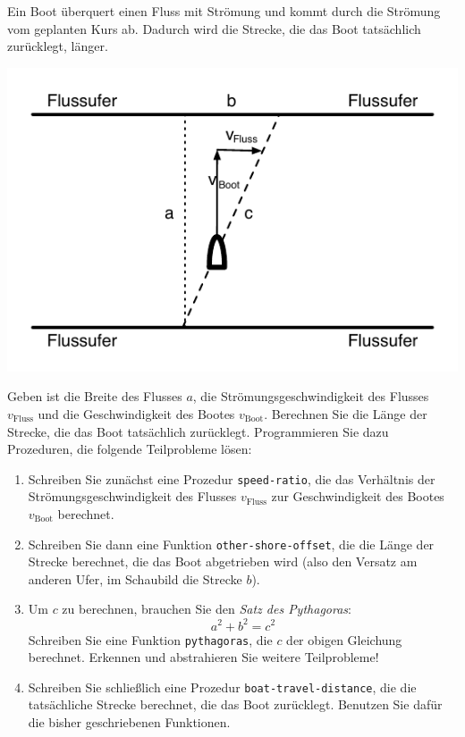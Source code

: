 \begin{aufgabe}

 Ein Boot überquert einen Fluss mit Strömung und
  kommt durch die Strömung vom geplanten Kurs ab.  Dadurch wird die
  Strecke, die das Boot tatsächlich zurücklegt, länger.

  \begin{center}
    \includegraphics{riverboat}
  \end{center}

  Geben ist die Breite des Flusses $a$, die Strömungsgeschwindigkeit
  des Flusses $v_{\text{Fluss}}$ und die Geschwindigkeit des Bootes
  $v_{\text{Boot}}$.  Berechnen Sie die Länge der Strecke, die das
  Boot tatsächlich zurücklegt.  Programmieren Sie dazu Prozeduren, die
  folgende Teilprobleme lösen:

  \begin{enumerate}
  \item Schreiben Sie zunächst eine Prozedur \texttt{speed-ratio}, die
    das Verhältnis der Strömungsgeschwindigkeit des Flusses
    $v_{\text{Fluss}}$ zur Geschwindigkeit des Bootes
    $v_{\text{Boot}}$ berechnet.

  \item Schreiben Sie dann eine Funktion \texttt{other-shore-offset},
    die die Länge der Strecke berechnet, die das Boot abgetrieben wird
    (also den Versatz am anderen Ufer, im Schaubild die Strecke $b$).

  \item Um $c$ zu berechnen, brauchen Sie den \textit{Satz des
      Pythagoras}:
    \begin{displaymath}
      a^2 + b^2 = c^2
    \end{displaymath}
    Schreiben Sie eine Funktion \texttt{pythagoras}, die $c$ der
    obigen Gleichung berechnet.  Erkennen und abstrahieren Sie weitere
    Teilprobleme!

  \item Schreiben Sie schließlich eine Prozedur
    \texttt{boat-travel-distance}, die die tatsächliche Strecke
    berechnet, die das Boot zurücklegt.  Benutzen Sie dafür die bisher
    geschriebenen Funktionen.
  \end{enumerate}
\end{aufgabe}

